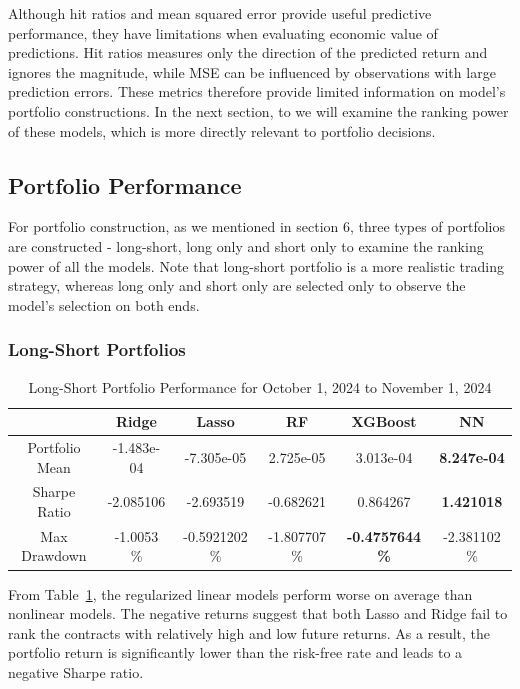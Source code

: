\documentclass[oneside, 12pt]{article}
\newcommand*{\1}{\text{\scalebox{1.1}{\usefont{U}{bbold}{m}{n}1}}}
\begin{document}
Although hit ratios and mean squared error provide useful predictive performance, they have limitations when evaluating economic value of predictions. Hit ratios measures only the direction of the predicted return and ignores the magnitude, while MSE can be influenced by observations with large prediction errors. These metrics therefore provide limited information on model's portfolio constructions. In the next section, to we will examine the ranking power of these models, which is more directly relevant to portfolio decisions.

\subsection{Portfolio Performance}
For portfolio construction, as we mentioned in section 6, three types of portfolios are constructed - long-short, long only and short only to examine the ranking power of all the models. Note that long-short portfolio is a more realistic trading strategy, whereas long only and short only are selected only to observe the model's selection on both ends.  

\subsubsection{Long-Short Portfolios}
\begin{table}[h!]
  \centering
  \begin{tabular}{cccccc}
  \hline
  & Ridge & Lasso & RF & XGBoost & NN \\
  \hline
\rule{0pt}{3ex} Portfolio Mean & -1.483e-04 & -7.305e-05 & 2.725e-05 & 3.013e-04 & \textbf{8.247e-04} \\
 Sharpe Ratio & -2.085106 & -2.693519 & -0.682621 &  0.864267 & \textbf{1.421018}  \\
 Max Drawdown & -1.0053 \% & -0.5921202 \% & -1.807707 \% & \textbf{-0.4757644 \%} & -2.381102 \% \\
 \hline
 \end{tabular}
  \caption{Long-Short Portfolio Performance for October 1, 2024 to November 1, 2024}
  \label{ls_port}
\end{table}

From Table~\ref{ls_port}, the regularized linear models perform worse on average than nonlinear models. The negative returns suggest that both Lasso and Ridge fail to rank the contracts with relatively high and low future returns. As a result, the portfolio return is significantly lower than the risk-free rate and leads to a negative Sharpe ratio. \newline
\end{document}
